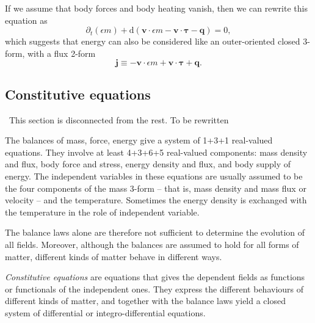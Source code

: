\documentclass[\ifafour a4paper,12pt,\else a5paper,10pt,\fi%
onecolumn,oneside,article,%
british%
]{memoir}
\theoremstyle{remark}
\theoremstyle{innote}
\newcommand*{\de}{\partialup}%
\newcommand*{\di}{\mathrm{d}}%
\renewcommand*{\|}{\nonscript\,\vert\nonscript\;\mathopen{}}
\newcommand*{\puzzle}{{\fontencoding{U}\fontfamily{fontawesometwo}\selectfont\symbol{225}}}
\newcommand{\mynote}[1]{ {\color{notecolour}\puzzle\ #1}}
\newcommand*{\ydd}{m}
\newcommand*{\yd}{\ydd}
\newcommand*{\yqq}{q}
\newcommand*{\yq}{\bm{\yqq}}
\newcommand*{\yTT}{\tau}
\newcommand*{\yT}{\bm{\yTT}}
\newcommand*{\yvvt}{v}
\newcommand*{\yvt}{\bm{\yvvt}}
\newcommand*{\ypp}{j}
\newcommand*{\yp}{\bm{\ypp}}
\newcommand*{\ye}{\epsilon}
\begin{document}
If we assume that body forces and body heating vanish, then we can rewrite
this equation as
\begin{equation}
  \label{eq:balance_energy_suggests_3form}
  \de_t(\ye\yd) + \di(\yvt \cdot \ye\yd -\yvt\cdot\yT - \yq) = 0,
\end{equation}
which suggests that energy can also be considered like an outer-oriented
closed 3-form, with a flux 2-form
\begin{equation}
  \label{eq:energy_4velocity}
  \yp \equiv -\yvt \cdot\ye\yd + \yvt\cdot\yT +\yq.
\end{equation}


\subsection{Constitutive equations}
\label{sec:constitutive equations}

\mynote{This section is disconnected from the rest. To be rewritten}

The balances of mass, force, energy give a system of 1+3+1 real-valued
equations. They involve at least 4+3+6+5 real-valued components: mass
density and flux, body force and stress, energy density and flux, and body
supply of energy. The independent variables in these equations are usually
assumed to be the four components of the mass 3-form -- that is, mass
density and mass flux or velocity -- and the temperature. Sometimes the
energy density is exchanged with the temperature in the role of independent
variable.

The balance laws alone are therefore not sufficient to determine the
evolution of all fields. Moreover, although the balances are assumed to
hold for all forms of matter, different kinds of matter behave in different
ways.

\emph{Constitutive equations} are equations that gives the dependent fields
as functions or functionals of the independent ones. They express the
different behaviours of different kinds of matter, and together with the
balance laws yield a closed system of differential or integro-differential
equations.
\end{document}
